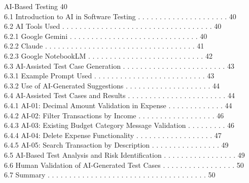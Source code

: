\documentclass[12pt,a4paper]{report}
\begin{document}
 AI-Based Testing                                                                           40\\ 
6.1 Introduction to AI in Software Testing . . . . . . . . . . . . . . . . . . . . .       40\\ 
6.2 AI Tools Used . . . . . . . . . . . . . . . . . . . . . . . . . . . . . . . . . . .    40\\ 
6.2.1 Google Gemini . . . . . . . . . . . . . . . . . . . . . . . . . . . . . .        40\\ 
6.2.2 Claude . . . . . . . . . . . . . . . . . . . . . . . . . . . . . . . . . . .     41\\ 
6.2.3 Google NotebookLM . . . . . . . . . . . . . . . . . . . . . . . . . . .          42\\ 
6.3 AI-Assisted Test Case Generation . . . . . . . . . . . . . . . . . . . . . . . .       43\\ 
6.3.1 Example Prompt Used . . . . . . . . . . . . . . . . . . . . . . . . . .          43\\ 
6.3.2 Use of AI-Generated Suggestions . . . . . . . . . . . . . . . . . . . .          44\\ 
6.4 AI-Assisted Test Cases and Results . . . . . . . . . . . . . . . . . . . . . . .       44\\ 
6.4.1 AI-01: Decimal Amount Validation in Expense . . . . . . . . . . . . .            44\\ 
6.4.2 AI-02: Filter Transactions by Income . . . . . . . . . . . . . . . . . .         46\\ 
6.4.3 AI-03: Existing Budget Category Message Validation . . . . . . . . .             46\\ 
6.4.4 AI-04: Delete Expense Functionality . . . . . . . . . . . . . . . . . .          47\\ 
6.4.5 AI-05: Search Transaction by Description . . . . . . . . . . . . . . . .         49\\ 
6.5 AI-Based Test Analysis and Risk Identification . . . . . . . . . . . . . . . . .       49\\ 
6.6 Human Validation of AI-Generated Test Cases . . . . . . . . . . . . . . . . .          50\\ 
6.7 Summary . . . . . . . . . . . . . . . . . . . . . . . . . . . . . . . . . . . . .      50\\ 
\end{document}
